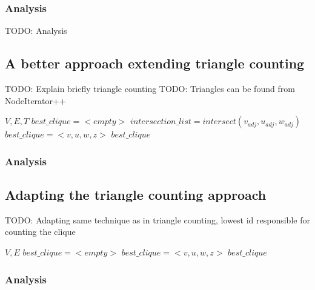 \documentclass{article}
\begin{document}
\subsubsection{Analysis}
TODO: Analysis

\subsection{A better approach extending triangle counting}
TODO: Explain briefly triangle counting
TODO: Triangles can be found from NodeIterator++

\begin{algorithm}
\caption{$4clique\_iterator+$}
\begin{algorithmic}
\REQUIRE $V,E,T$
\STATE $best\_clique = <empty>$
\STATE $intersection\_list = intersect(v_{adj}, u_{adj}, w_{adj})$
\STATE $best\_clique = <v,u,w,z>$
\ENDIF
\ENDFOR
\ENDIF
\ENDFOR
\RETURN $best\_clique$
\end{algorithmic}
\end{algorithm}

\subsubsection{Analysis}

\subsection{Adapting the triangle counting approach}
TODO: Adapting same technique as in triangle counting, lowest id responsible for counting the clique

\begin{algorithm}
\caption{$4clique\_iterator$}
\begin{algorithmic}
\REQUIRE $V,E$
\STATE $best\_clique = <empty>$
\STATE $best\_clique = <v,u,w,z>$
\ENDIF
\ENDIF
\ENDFOR
\ENDIF
\ENDFOR
\ENDIF
\ENDFOR
\ENDFOR
\RETURN $best\_clique$
\end{algorithmic}
\end{algorithm}

\subsubsection{Analysis}
\end{document}

